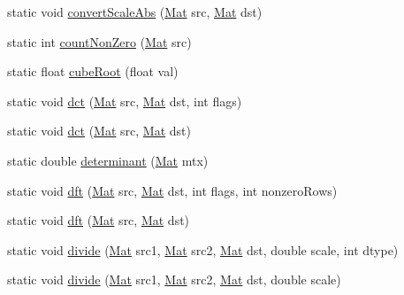 \begin{DoxyCompactItemize}
\item 
static void \mbox{\hyperlink{classorg_1_1opencv_1_1core_1_1_core_adc3cd8b03f5b39cb0d795dddd43e2e16}{convert\+Scale\+Abs}} (\mbox{\hyperlink{classorg_1_1opencv_1_1core_1_1_mat}{Mat}} src, \mbox{\hyperlink{classorg_1_1opencv_1_1core_1_1_mat}{Mat}} dst)
\item 
static int \mbox{\hyperlink{classorg_1_1opencv_1_1core_1_1_core_a216308f36e765f82c521087fe283e045}{count\+Non\+Zero}} (\mbox{\hyperlink{classorg_1_1opencv_1_1core_1_1_mat}{Mat}} src)
\item 
static float \mbox{\hyperlink{classorg_1_1opencv_1_1core_1_1_core_a08e2ce54e07e80ac946866bf205d9333}{cube\+Root}} (float val)
\item 
static void \mbox{\hyperlink{classorg_1_1opencv_1_1core_1_1_core_a1f0b3c28295d4db1ecd755201833d6cb}{dct}} (\mbox{\hyperlink{classorg_1_1opencv_1_1core_1_1_mat}{Mat}} src, \mbox{\hyperlink{classorg_1_1opencv_1_1core_1_1_mat}{Mat}} dst, int flags)
\item 
static void \mbox{\hyperlink{classorg_1_1opencv_1_1core_1_1_core_ab3eb0749baa205b6ae4c7af183c57177}{dct}} (\mbox{\hyperlink{classorg_1_1opencv_1_1core_1_1_mat}{Mat}} src, \mbox{\hyperlink{classorg_1_1opencv_1_1core_1_1_mat}{Mat}} dst)
\item 
static double \mbox{\hyperlink{classorg_1_1opencv_1_1core_1_1_core_a9108dd80dbec1fd4f196a6e9e2564734}{determinant}} (\mbox{\hyperlink{classorg_1_1opencv_1_1core_1_1_mat}{Mat}} mtx)
\item 
static void \mbox{\hyperlink{classorg_1_1opencv_1_1core_1_1_core_a43313221157a3008972a04727a65a58d}{dft}} (\mbox{\hyperlink{classorg_1_1opencv_1_1core_1_1_mat}{Mat}} src, \mbox{\hyperlink{classorg_1_1opencv_1_1core_1_1_mat}{Mat}} dst, int flags, int nonzero\+Rows)
\item 
static void \mbox{\hyperlink{classorg_1_1opencv_1_1core_1_1_core_a06e879ce4de29934c450c8f1e7631a24}{dft}} (\mbox{\hyperlink{classorg_1_1opencv_1_1core_1_1_mat}{Mat}} src, \mbox{\hyperlink{classorg_1_1opencv_1_1core_1_1_mat}{Mat}} dst)
\item 
static void \mbox{\hyperlink{classorg_1_1opencv_1_1core_1_1_core_ad0cc67e80d303076c4a8d486fe6b82c9}{divide}} (\mbox{\hyperlink{classorg_1_1opencv_1_1core_1_1_mat}{Mat}} src1, \mbox{\hyperlink{classorg_1_1opencv_1_1core_1_1_mat}{Mat}} src2, \mbox{\hyperlink{classorg_1_1opencv_1_1core_1_1_mat}{Mat}} dst, double scale, int dtype)
\item 
static void \mbox{\hyperlink{classorg_1_1opencv_1_1core_1_1_core_af2bc7a755d5d149644b0eceef2c3decc}{divide}} (\mbox{\hyperlink{classorg_1_1opencv_1_1core_1_1_mat}{Mat}} src1, \mbox{\hyperlink{classorg_1_1opencv_1_1core_1_1_mat}{Mat}} src2, \mbox{\hyperlink{classorg_1_1opencv_1_1core_1_1_mat}{Mat}} dst, double scale)

\end{DoxyCompactItemize}
